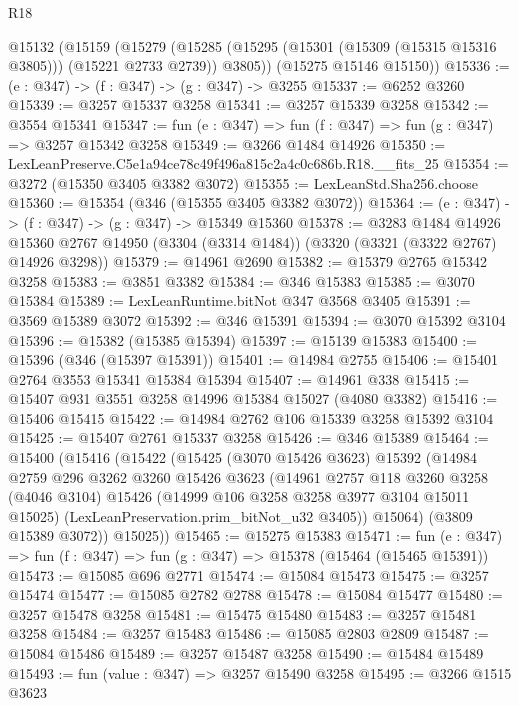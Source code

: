 \begin{lexlean}{R18}
\begin{coremodule}
  @15132
    (@15159
      (@15279 (@15285 (@15295 (@15301 (@15309 (@15315 @15316 @3805))) (@15221 @2733 @2739)) @3805))
      (@15275 @15146 @15150))
@15336 := (e : @347) -> (f : @347) -> (g : @347) -> @3255
@15337 := @6252 @3260
@15339 := @3257 @15337 @3258
@15341 := @3257 @15339 @3258
@15342 := @3554 @15341
@15347 := fun (e : @347) => fun (f : @347) => fun (g : @347) => @3257 @15342 @3258
@15349 := @3266 @1484 @14926
@15350 := LexLeanPreserve.C5e1a94ce78c49f496a815c2a4c0c686b.R18.__fits_25
@15354 := @3272 (@15350 @3405 @3382 @3072)
@15355 := LexLeanStd.Sha256.choose
@15360 := @15354 (@346 (@15355 @3405 @3382 @3072))
@15364 := (e : @347) -> (f : @347) -> (g : @347) -> @15349 @15360
@15378 := @3283
    @1484
    @14926
    @15360
    @2767
    @14950
    (@3304 (@3314 @1484))
    (@3320 (@3321 (@3322 @2767) @14926 @3298))
@15379 := @14961 @2690
@15382 := @15379 @2765 @15342 @3258
@15383 := @3851 @3382
@15384 := @346 @15383
@15385 := @3070 @15384
@15389 := LexLeanRuntime.bitNot @347 @3568 @3405
@15391 := @3569 @15389 @3072
@15392 := @346 @15391
@15394 := @3070 @15392 @3104
@15396 := @15382 (@15385 @15394)
@15397 := @15139 @15383
@15400 := @15396 (@346 (@15397 @15391))
@15401 := @14984 @2755
@15406 := @15401 @2764 @3553 @15341 @15384 @15394
@15407 := @14961 @338
@15415 := @15407 @931 @3551 @3258 @14996 @15384 @15027 (@4080 @3382)
@15416 := @15406 @15415
@15422 := @14984 @2762 @106 @15339 @3258 @15392 @3104
@15425 := @15407 @2761 @15337 @3258
@15426 := @346 @15389
@15464 := @15400
    (@15416
      (@15422
        (@15425
          (@3070 @15426 @3623)
          @15392
          (@14984
            @2759
            @296
            @3262
            @3260
            @15426
            @3623
            (@14961
              @2757
              @118
              @3260
              @3258
              (@4046 @3104)
              @15426
              (@14999 @106 @3258 @3258 @3977 @3104 @15011 @15025)
              (LexLeanPreservation.prim_bitNot_u32 @3405))
            @15064)
          (@3809 @15389 @3072))
        @15025))
@15465 := @15275 @15383
@15471 := fun (e : @347) => fun (f : @347) => fun (g : @347) => @15378 (@15464 (@15465 @15391))
@15473 := @15085 @696 @2771
@15474 := @15084 @15473
@15475 := @3257 @15474
@15477 := @15085 @2782 @2788
@15478 := @15084 @15477
@15480 := @3257 @15478 @3258
@15481 := @15475 @15480
@15483 := @3257 @15481 @3258
@15484 := @3257 @15483
@15486 := @15085 @2803 @2809
@15487 := @15084 @15486
@15489 := @3257 @15487 @3258
@15490 := @15484 @15489
@15493 := fun (value : @347) => @3257 @15490 @3258
@15495 := @3266 @1515 @3623

\end{coremodule}
\end{lexlean}
